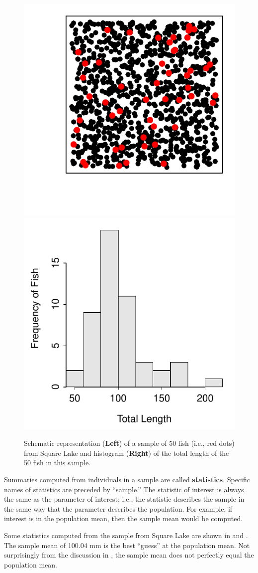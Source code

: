 \documentclass[10pt,openany]{book}\usepackage[]{graphicx}\usepackage[]{color}
\newenvironment{knitrout}{}{} %
\begin{document}
\begin{knitrout}
\color{fgcolor}\begin{figure}[hbtp]

{\centering \includegraphics[width=.4\linewidth]{Figs/SquareLakeSample1-1} 
\includegraphics[width=.4\linewidth]{Figs/SquareLakeSample1-2} 

}

\caption{Schematic representation (\textbf{Left}) of a sample of 50 fish (i.e., red dots) from Square Lake and histogram (\textbf{Right}) of the total length of the 50 fish in this sample.}\label{fig:SquareLakeSample1}
\end{figure}


\end{knitrout}

Summaries computed from individuals in a sample are called \textbf{statistics}.  Specific names of statistics are preceded by ``sample.''  The statistic of interest is always the same as the parameter of interest; i.e., the statistic describes the sample in the same way that the parameter describes the population. For example, if interest is in the population mean, then the sample mean would be computed.

Some statistics computed from the sample from Square Lake are shown in  and . The sample mean of 100.04 mm is the best ``guess'' at the population mean. Not surprisingly from the discussion in , the sample mean does not perfectly equal the population mean.
\end{document}
